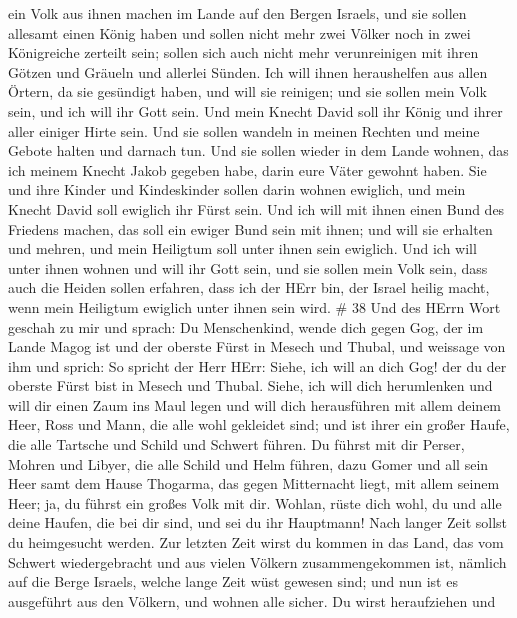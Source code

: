 ein Volk aus ihnen machen im Lande auf den Bergen Israels, und sie
sollen allesamt einen König haben und sollen nicht mehr zwei Völker noch
in zwei Königreiche zerteilt sein;  sollen sich auch nicht
mehr verunreinigen mit ihren Götzen und Gräueln und allerlei Sünden. Ich
will ihnen heraushelfen aus allen Örtern, da sie gesündigt haben, und
will sie reinigen; und sie sollen mein Volk sein, und ich will ihr Gott
sein.  Und mein Knecht David soll ihr König und ihrer aller
einiger Hirte sein. Und sie sollen wandeln in meinen Rechten und meine
Gebote halten und darnach tun.  Und sie sollen wieder in
dem Lande wohnen, das ich meinem Knecht Jakob gegeben habe, darin eure
Väter gewohnt haben. Sie und ihre Kinder und Kindeskinder sollen darin
wohnen ewiglich, und mein Knecht David soll ewiglich ihr Fürst sein.
 Und ich will mit ihnen einen Bund des Friedens machen, das
soll ein ewiger Bund sein mit ihnen; und will sie erhalten und mehren,
und mein Heiligtum soll unter ihnen sein ewiglich.  Und ich
will unter ihnen wohnen und will ihr Gott sein, und sie sollen mein Volk
sein,  dass auch die Heiden sollen erfahren, dass ich der
HErr bin, der Israel heilig macht, wenn mein Heiligtum ewiglich unter
ihnen sein wird. \# 38  Und des HErrn Wort geschah zu mir
und sprach:  Du Menschenkind, wende dich gegen Gog, der im
Lande Magog ist und der oberste Fürst in Mesech und Thubal, und weissage
von ihm  und sprich: So spricht der Herr HErr: Siehe, ich
will an dich Gog! der du der oberste Fürst bist in Mesech und Thubal.
 Siehe, ich will dich herumlenken und will dir einen Zaum
ins Maul legen und will dich herausführen mit allem deinem Heer, Ross
und Mann, die alle wohl gekleidet sind; und ist ihrer ein großer Haufe,
die alle Tartsche und Schild und Schwert führen.  Du führst
mit dir Perser, Mohren und Libyer, die alle Schild und Helm führen,
 dazu Gomer und all sein Heer samt dem Hause Thogarma, das
gegen Mitternacht liegt, mit allem seinem Heer; ja, du führst ein großes
Volk mit dir.  Wohlan, rüste dich wohl, du und alle deine
Haufen, die bei dir sind, und sei du ihr Hauptmann!  Nach
langer Zeit sollst du heimgesucht werden. Zur letzten Zeit wirst du
kommen in das Land, das vom Schwert wiedergebracht und aus vielen
Völkern zusammengekommen ist, nämlich auf die Berge Israels, welche
lange Zeit wüst gewesen sind; und nun ist es ausgeführt aus den Völkern,
und wohnen alle sicher.  Du wirst heraufziehen und
